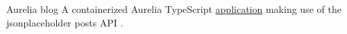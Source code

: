 \datedsubsection{}
{Aurelia blog}
{}
{A containerized Aurelia TypeScript  \href{https://github.com/JacobArchambault/aurelia-blog}{application} making use of the jsonplaceholder posts API .}
